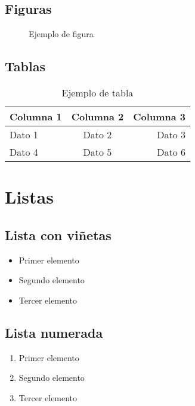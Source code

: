 \documentclass[12pt,a4paper]{article}
\begin{document}
\subsection{Figuras}

\begin{figure}[H]
    \centering
    \caption{Ejemplo de figura}
    \label{fig:ejemplo}
\end{figure}

\subsection{Tablas}

\begin{table}[H]
    \centering
    \caption{Ejemplo de tabla}
    \label{tab:ejemplo}
    \begin{tabular}{lcr}
        \toprule
        Columna 1 & Columna 2 & Columna 3 \\
        \midrule
        Dato 1    & Dato 2    & Dato 3    \\
        Dato 4    & Dato 5    & Dato 6    \\
        \bottomrule
    \end{tabular}
\end{table}

\section{Listas}

\subsection{Lista con viñetas}
\begin{itemize}
    \item Primer elemento
    \item Segundo elemento
    \item Tercer elemento
\end{itemize}

\subsection{Lista numerada}
\begin{enumerate}
    \item Primer elemento
    \item Segundo elemento
    \item Tercer elemento
\end{enumerate}
\end{document}
